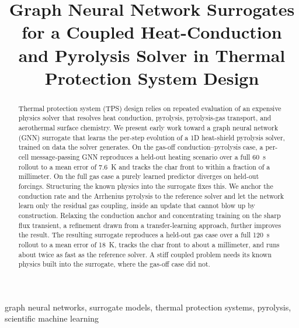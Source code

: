 \documentclass[conference]{IEEEtran}
\begin{document}
\title{Graph Neural Network Surrogates for a Coupled Heat-Conduction and
Pyrolysis Solver in Thermal Protection System Design}

\author{
}

\maketitle

\begin{abstract}
Thermal protection system (TPS) design relies on repeated evaluation of an
expensive physics solver that resolves heat conduction, pyrolysis,
pyrolysis-gas transport, and aerothermal surface chemistry. We present early work
toward a graph neural network (GNN) surrogate that learns the per-step evolution
of a 1D heat-shield pyrolysis solver, trained on data the solver generates. On the
gas-off conduction--pyrolysis case, a per-cell message-passing GNN reproduces a
held-out heating scenario over a full 60~s rollout to a mean error of 7.6~K and
tracks the char front to within a fraction of a millimeter. On the full gas case a purely learned predictor diverges on held-out forcings.
Structuring the known physics into the surrogate fixes this. We anchor the
conduction rate and the Arrhenius pyrolysis to the reference solver and let the
network learn only the residual gas coupling, inside an update that cannot blow
up by construction. Relaxing the conduction anchor and concentrating training on
the sharp flux transient, a refinement drawn from a transfer-learning approach,
further improves the result. The resulting surrogate reproduces a held-out gas case
over a full 120~s rollout to a mean error of 18~K, tracks the char front to about a
millimeter, and runs about twice as fast as the reference solver. A stiff coupled
problem needs its known physics built into the surrogate, where the gas-off case did
not.
\end{abstract}

\begin{IEEEkeywords}
graph neural networks, surrogate models, thermal protection systems, pyrolysis,
scientific machine learning
\end{IEEEkeywords}
\end{document}
